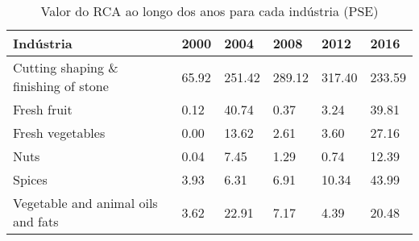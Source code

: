 \begin{table}
\centering
\caption{Valor do RCA ao longo dos anos para cada indústria (PSE)}
\begin{tabular}{p{6cm}p{1.5cm}p{1.5cm}p{1.5cm}p{1.5cm}p{1.5cm}}
\toprule
                           Indústria &  2000 &   2004 &   2008 &   2012 &   2016 \\
\midrule
Cutting shaping \& finishing of stone & 65.92 & 251.42 & 289.12 & 317.40 & 233.59 \\
                         Fresh fruit &  0.12 &  40.74 &   0.37 &   3.24 &  39.81 \\
                    Fresh vegetables &  0.00 &  13.62 &   2.61 &   3.60 &  27.16 \\
                                Nuts &  0.04 &   7.45 &   1.29 &   0.74 &  12.39 \\
                              Spices &  3.93 &   6.31 &   6.91 &  10.34 &  43.99 \\
  Vegetable and animal oils and fats &  3.62 &  22.91 &   7.17 &   4.39 &  20.48 \\
\bottomrule
\end{tabular}
\end{table}

